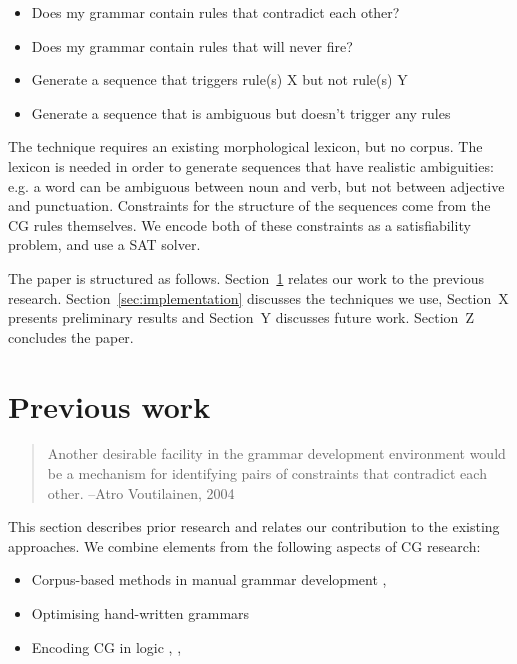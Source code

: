 \begin{itemize}
\item Does my grammar contain rules that contradict each other?
\item Does my grammar contain rules that will never fire?
\item Generate a sequence that triggers rule(s) X but not rule(s) Y
\item Generate a sequence that is ambiguous but doesn't trigger any rules
\end{itemize}

The technique requires an existing morphological lexicon, but no corpus. 
The lexicon is needed in order to generate sequences that have realistic ambiguities: e.g. a word can be ambiguous between noun and verb, but not between adjective and punctuation. 
Constraints for the structure of the sequences come from the CG rules themselves.
We encode both of these constraints as a satisfiability problem, and use a SAT solver.

The paper is structured as follows. Section~\ref{sec:prev} relates our work to the previous research. Section~\ref{sec:implementation} discusses the techniques we use, Section~X presents preliminary results and  Section~Y discusses future work. Section~Z concludes the paper.






\section{Previous work}
\label{sec:prev}

\begin{quote}Another desirable facility in the grammar development environment would
be a mechanism for identifying pairs of constraints that contradict each
other.
--Atro Voutilainen, 2004
\end{quote}

This section describes prior research and relates our contribution to the existing approaches.
We combine elements from the following aspects of CG research:

\begin{itemize}
\item Corpus-based methods in manual grammar development \cite{voutilainen2004}, \cite{tyers_reynolds2015}
\item Optimising hand-written grammars \cite{bick2013tuning}
\item Encoding CG in logic \cite{lager98}, \cite{lager_nivre01}, \cite{listenmaa_claessen2015}
\end{itemize}

